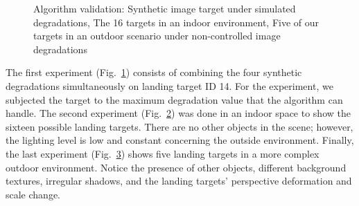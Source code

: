 \begin{figure}[h!]
\centering
\begin{subfigure}[t]{\textwidth+20pt\relax}
    \caption{} \label{fig:synthetic_result}
\end{subfigure}\hfill
\begin{subfigure}[t]{0.315\textwidth}
    \caption{} \label{fig:indoor_result}
\end{subfigure}\hfill
\begin{subfigure}[t]{0.315\textwidth}
    \caption{}  \label{fig:outdoor_result}
\end{subfigure}
\caption{Algorithm validation:  Synthetic image target under simulated degradations,  The 16 targets in an indoor environment,  Five of our targets in an outdoor scenario under non-controlled image degradations}\label{fig:validation}
\end{figure}

The first experiment (Fig.\ \ref{fig:synthetic_result}) consists of combining the four synthetic degradations simultaneously on landing target ID 14. For the experiment, we subjected the target to the maximum degradation value that the algorithm can handle. The second experiment (Fig.\ \ref{fig:indoor_result}) was done in an indoor space to show the sixteen possible landing targets. There are no other objects in the scene; however, the lighting level is low and constant concerning the outside environment. Finally, the last experiment (Fig.\ \ref{fig:outdoor_result}) shows five landing targets in a more complex outdoor environment. Notice the presence of other objects, different background textures, irregular shadows, and the landing targets' perspective deformation and scale change. 

